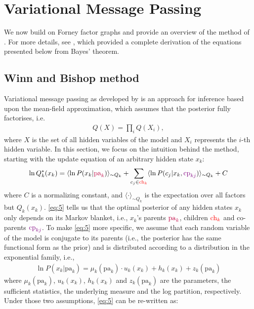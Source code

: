 \documentclass[twoside,11pt]{article}
\begin{document}
\section{Variational Message Passing}\label{sec:vmp}

We now build on Forney factor graphs and provide an overview of the method of \citet{VMP_TUTO}. For more details, see \citet{AI_VMP}, which provided a complete derivation of the equations presented below from Bayes' theorem.

\subsection{Winn and Bishop method}

Variational message passing as developed by \citet{VMP_TUTO} is an approach for inference based upon the mean-field approximation, which assumes that the posterior fully factorises, i.e.
\begin{align}
Q(X) = \prod_{i} Q(X_i),
\end{align}
where $X$ is the set of all hidden variables of the model and $X_i$ represents the $i$-th hidden variable. In this section, we focus on the intuition behind the method, starting with the update equation of an arbitrary hidden state $x_k$:
\begin{align}\label{eq:5}
\ln Q_k^*(x_k) = \langle \ln P(x_k|{\color{purple}\text{pa}_k}) \rangle_{\sim Q_k} + \sum_{c_j \in {\color{red}\text{ch}_k}} \langle \ln P(c_j|x_k, {\color{violet}\text{cp}_{kj}}) \rangle_{\sim Q_k} + C
\end{align}
where $C$ is a normalizing constant, and $\langle \cdot \rangle_{\sim Q_k}$ is the expectation over all factors but $Q_k(x_k)$. \eqref{eq:5} tells us that the optimal posterior of any hidden states $x_k$ only depends on its Markov blanket, i.e., $x_k$'s parents ${\color{purple}\text{pa}_k}$, children ${\color{red}\text{ch}_k}$ and co-parents ${\color{violet}\text{cp}_{kj}}$. To make \eqref{eq:5} more specific, we assume that each random variable of the model is conjugate to its parents (i.e., the posterior has the same functional form as the prior) and is distributed according to a distribution in the exponential family, i.e., 
\begin{align}\label{eq:prior_VMP}
\ln P(x_k|\text{pa}_k) = \mu_k(\text{pa}_k) \cdot u_k(x_k) + h_k(x_k) + z_k(\text{pa}_k)
\end{align}
where $\mu_k(\text{pa}_k)$, $u_k(x_k)$, $h_k(x_k)$ and $z_k(\text{pa}_k)$ are the parameters, the sufficient statistics, the underlying measure and the log partition, respectively. Under those two assumptions, \eqref{eq:5} can be re-written as:
\end{document}
